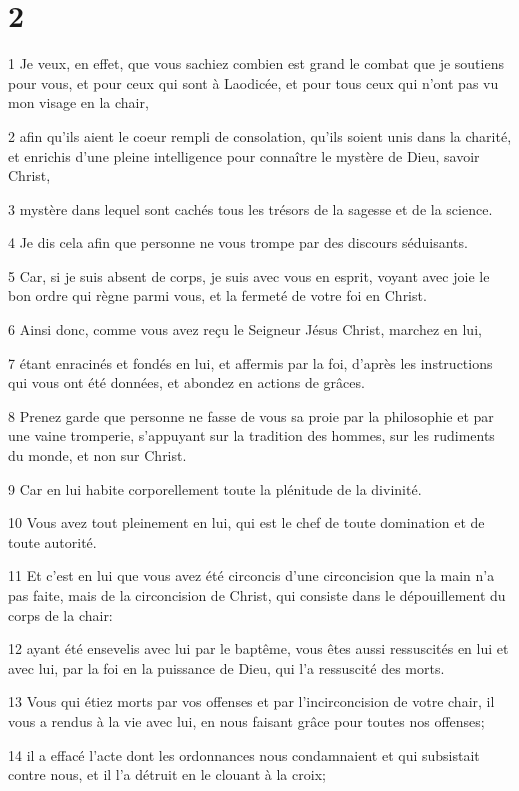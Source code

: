 \chapter{2}

\par 1 Je veux, en effet, que vous sachiez combien est grand le combat que je soutiens pour vous, et pour ceux qui sont à Laodicée, et pour tous ceux qui n'ont pas vu mon visage en la chair,
\par 2 afin qu'ils aient le coeur rempli de consolation, qu'ils soient unis dans la charité, et enrichis d'une pleine intelligence pour connaître le mystère de Dieu, savoir Christ,
\par 3 mystère dans lequel sont cachés tous les trésors de la sagesse et de la science.
\par 4 Je dis cela afin que personne ne vous trompe par des discours séduisants.
\par 5 Car, si je suis absent de corps, je suis avec vous en esprit, voyant avec joie le bon ordre qui règne parmi vous, et la fermeté de votre foi en Christ.
\par 6 Ainsi donc, comme vous avez reçu le Seigneur Jésus Christ, marchez en lui,
\par 7 étant enracinés et fondés en lui, et affermis par la foi, d'après les instructions qui vous ont été données, et abondez en actions de grâces.
\par 8 Prenez garde que personne ne fasse de vous sa proie par la philosophie et par une vaine tromperie, s'appuyant sur la tradition des hommes, sur les rudiments du monde, et non sur Christ.
\par 9 Car en lui habite corporellement toute la plénitude de la divinité.
\par 10 Vous avez tout pleinement en lui, qui est le chef de toute domination et de toute autorité.
\par 11 Et c'est en lui que vous avez été circoncis d'une circoncision que la main n'a pas faite, mais de la circoncision de Christ, qui consiste dans le dépouillement du corps de la chair:
\par 12 ayant été ensevelis avec lui par le baptême, vous êtes aussi ressuscités en lui et avec lui, par la foi en la puissance de Dieu, qui l'a ressuscité des morts.
\par 13 Vous qui étiez morts par vos offenses et par l'incirconcision de votre chair, il vous a rendus à la vie avec lui, en nous faisant grâce pour toutes nos offenses;
\par 14 il a effacé l'acte dont les ordonnances nous condamnaient et qui subsistait contre nous, et il l'a détruit en le clouant à la croix;
